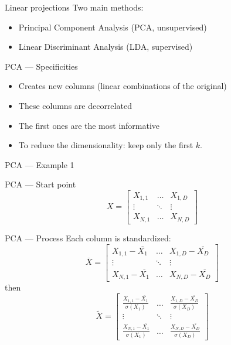 \begin{frame}{Linear projections}
  Two main methods:
  \begin{itemize}
    \item Principal Component Analysis (PCA, unsupervised)
    \item Linear Discriminant Analysis (LDA, supervised)
  \end{itemize}
\end{frame}

\begin{frame}{PCA --- Specificities}
  \begin{itemize}
    \item Creates new columns (linear combinations of the original)
    \item These columns are decorrelated
    \item The first ones are the most informative
    \item To reduce the dimensionality: keep only the first $k$.
  \end{itemize}
\end{frame}

\begin{frame}{PCA --- Example 1}
\end{frame}


\begin{frame}{PCA --- Start point}
  \[
  X = \begin{bmatrix}
    X_{1,1} & \dots  & X_{1,D} \\
    \vdots & \ddots & \vdots \\
    X_{N,1} & \dots  & X_{N,D}
  \end{bmatrix}
  \]
\end{frame}

\begin{frame}{PCA --- Process}
  Each column is standardized:
  \[
  \overline{X} =
  \begin{bmatrix}
    X_{1,1}-\overline{X_1} & \dots  & X_{1,D}-\overline{X_D} \\
    \vdots & \ddots & \vdots \\
    X_{N,1}-\overline{X_1} & \dots  & X_{N,D}-\overline{X_D}
  \end{bmatrix}
  \]
then
  \[
  \widetilde{X} =
  \begin{bmatrix}
    \frac{X_{1,1}-\overline{X_1}}{\sigma(X_1)} & \dots  & \frac{X_{1,D}-\overline{X_D}}{\sigma(X_D)} \\
    \vdots & \ddots & \vdots \\
    \frac{X_{N,1}-\overline{X_1}}{\sigma(X_1)} & \dots  & \frac{X_{N,D}-\overline{X_D}}{\sigma(X_D)}
  \end{bmatrix}
  \]
\end{frame}


